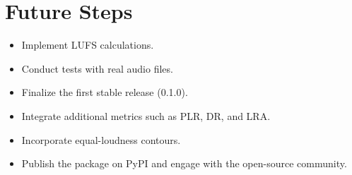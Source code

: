 \documentclass{article}
\begin{document}
\section{Future Steps}
\begin{itemize}
    \item Implement LUFS calculations.
    \item Conduct tests with real audio files.
    \item Finalize the first stable release (0.1.0).
    \item Integrate additional metrics such as PLR, DR, and LRA.
    \item Incorporate equal-loudness contours.
    \item Publish the package on PyPI and engage with the open-source community.
\end{itemize}
\end{document}
